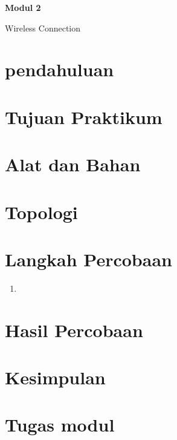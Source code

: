 \newpage
\setcounter{section}{0}
\renewcommand{\thesection}{\arabic{section}}

\begin{center}
    \Huge
    \textbf{Modul 2}
    
    Wireless Connection

\end{center}


\section{pendahuluan}


\section{Tujuan Praktikum}


\section{Alat dan Bahan}


\section{Topologi}


\section{Langkah Percobaan}
\begin{enumerate}
    \item 
\end{enumerate}

\section{Hasil Percobaan}


\section{Kesimpulan}


\section{Tugas modul}
